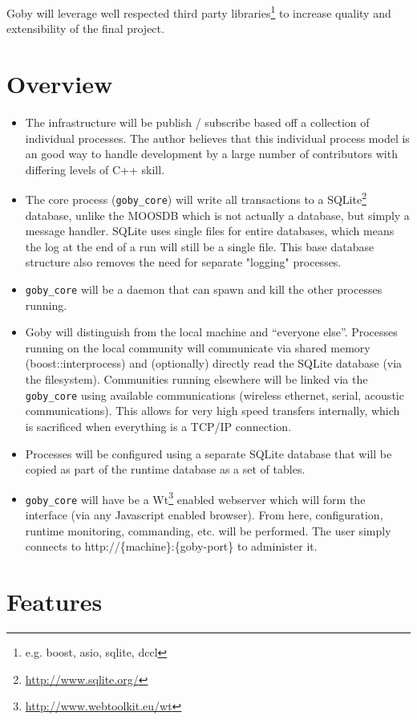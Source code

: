 \documentclass[10pt,letterpaper]{article}
\begin{document}
Goby will leverage well respected third party libraries\footnote{e.g. boost, asio, sqlite, dccl} to increase quality and extensibility of the final project. 

\section{Overview}

\begin{itemize}
\item The infrastructure will be publish / subscribe based off a collection of individual processes. The author believes that this individual process model is an good way to handle development by a large number of contributors with differing levels of C++ skill.
\item The core process (\verb|goby_core|) will write all transactions to a SQLite\footnote{\url{http://www.sqlite.org/}} database, unlike the MOOSDB which is not actually a database, but simply a message handler. SQLite uses single files for entire databases, which means the log at the end of a run will still be a single file. This base database structure also removes the need for separate "logging" processes.
\item \verb|goby_core| will be a daemon that can spawn and kill the other processes running.
\item Goby will distinguish from the local machine and ``everyone else''. Processes running on the local community will communicate via shared memory (boost::interprocess) and (optionally) directly read the SQLite database (via the filesystem). Communities running elsewhere will be linked via the \verb|goby_core| using available communications (wireless ethernet, serial, acoustic communications). This allows for very high speed transfers internally, which is sacrificed when everything is a TCP/IP connection. 
\item Processes will be configured using a separate SQLite database that will be copied as part of the runtime database as a set of tables.
\item \verb|goby_core| will have be a Wt\footnote{\url{http://www.webtoolkit.eu/wt}} enabled webserver which will form the interface (via any Javascript enabled browser). From here, configuration, runtime monitoring, commanding, etc. will be performed. The user simply connects to http://\{machine\}:\{goby-port\} to administer it. 
\end{itemize}

\section{Features}
\end{document}
